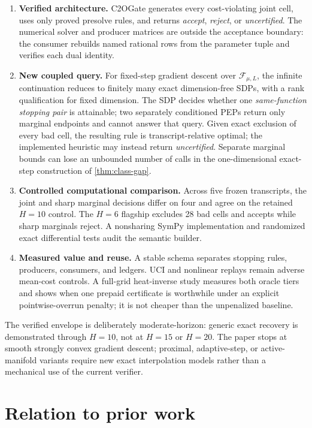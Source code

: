 \documentclass[smallextended]{svjour3}
\newcommand{\cF}{\mathcal{F}}
\begin{document}
\begin{enumerate}
  \item \textbf{Verified architecture.}  C2OGate generates
  every cost-violating joint cell, uses only proved presolve rules, and returns
  \emph{accept}, \emph{reject}, or \emph{uncertified}.  The numerical solver and
  producer matrices are outside the acceptance boundary: the consumer rebuilds
  named rational rows from the parameter tuple and verifies each dual identity.
  \item \textbf{New coupled query.}  For fixed-step gradient descent over
  $\cF_{\mu,L}$, the infinite continuation reduces to finitely many exact
  dimension-free SDPs, with a rank qualification for fixed dimension.  The
  SDP decides whether one \emph{same-function stopping pair} is attainable;
  two separately conditioned PEPs return only marginal endpoints and cannot
  answer that query.  Given
  exact exclusion of every bad cell, the resulting rule is transcript-relative
  optimal; the implemented heuristic may instead return \emph{uncertified}.
  Separate marginal bounds can lose an unbounded number of calls in the
  one-dimensional exact-step construction of \cref{thm:class-gap}.
  \item \textbf{Controlled computational comparison.}  Across five frozen
  transcripts, the joint and sharp marginal decisions differ on four and agree
  on the retained $H=10$ control.  The $H=6$ flagship excludes 28 bad cells and
  accepts while sharp marginals reject.  A nonsharing SymPy implementation and
  randomized exact differential tests audit the semantic builder.
  \item \textbf{Measured value and reuse.}  A stable schema separates stopping
  rules, producers, consumers, and ledgers.  UCI and nonlinear replays remain
  adverse mean-cost controls.  A full-grid heat-inverse study measures both
  oracle tiers and shows when one prepaid certificate is worthwhile under an
  explicit pointwise-overrun penalty; it is not cheaper than the unpenalized
  baseline.
\end{enumerate}

The verified envelope is deliberately moderate-horizon: generic exact recovery
is demonstrated through $H=10$, not at $H=15$ or $H=20$.  The paper stops at
smooth strongly convex gradient descent; proximal, adaptive-step, or
active-manifold variants require new exact interpolation models rather than a
mechanical use of the current verifier.

\section{Relation to prior work}
\end{document}
